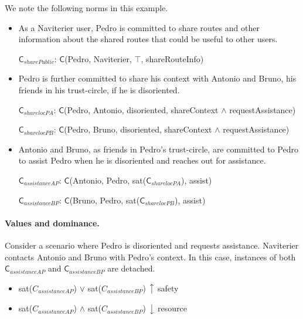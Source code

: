 \documentclass[11pt,          %
               phd,           %
               onehalfspacing %
               ]{ncsuthesis}
\newcommand{\msf}{\mathsf}
\newcommand{\C}{\msf{C}}
\newcommand{\bup}{\big\uparrow}
\newcommand{\bdown}{\big\downarrow}
\newcommand{\navigationapp}{Naviterier\xspace}
\newcommand{\nsa}[1]{\textcolor{green!50!black}{NSA:~~#1}}
\begin{document}
We note the following norms in this example. 

\begin{itemize}
\item As a \navigationapp user, Pedro is committed to share routes and
other information about the shared routes that could be useful to other
users.

$\C_{sharePublic}$: $\C$(Pedro, \navigationapp, $\top$, shareRouteInfo)

\item Pedro is further committed to share his context with Antonio and
Bruno, his friends in his trust-circle, if he is disoriented.

$\C_{sharelocPA}$: $\C$(Pedro, Antonio, disoriented, shareContext
$\land$ requestAssistance)

$\C_{sharelocPB}$: $\C$(Pedro, Bruno, disoriented, shareContext $\land$
requestAssistance)

\item Antonio and Bruno, as friends in Pedro's trust-circle,
are committed to Pedro to assist Pedro when he is disoriented and
reaches out for assistance.

 $\C_{assistanceAP}$: $\C$(Antonio, Pedro, sat($\C_{sharelocPA}$), assist)

$\C_{assistanceBP}$: $\C$(Bruno, Pedro, sat($\C_{sharelocPB}$), assist)

\end{itemize}

\paragraph*{Values and dominance.}

Consider a scenario where Pedro is disoriented and requests assistance.
\navigationapp contacts Antonio and Bruno with Pedro's context. In this
case, instances of both $\C_{assistanceAP}$ and $\C_{assistanceBP}$ are
detached.

\begin{itemize}

\item sat($C_{assistanceAP}$) $\lor$ sat($C_{assistanceBP}$) $\bup$ safety
\item sat($C_{assistanceAP}$) $\land$ sat($C_{assistanceBP}$) $\bdown$ resource 

\end{itemize}
\end{document}
